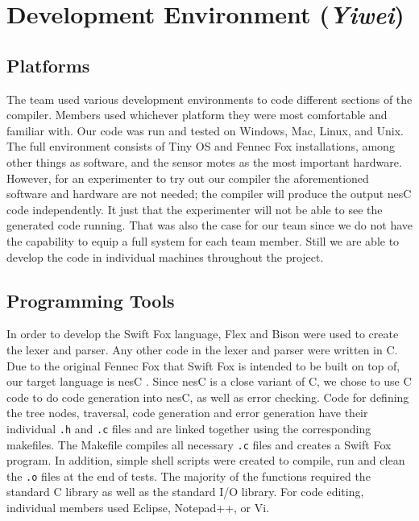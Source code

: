 \section{Development Environment (\textit{Yiwei})}

\subsection{Platforms}

The team used various development environments to code different sections
of the compiler. Members used whichever platform they were most comfortable
and familiar with. Our code was run and tested on Windows, Mac, Linux, and
Unix. The full environment consists of Tiny OS \cite{dunkels:2004a} and
Fennec Fox installations, among other things as software, and the sensor
motes as the most important hardware. However, for an experimenter to try
out our compiler the aforementioned software and hardware are not needed;
the compiler will produce the output nesC code independently. It just that
the experimenter will not be able to see the generated code running. That
was also the case for our team since we do not have the capability to
equip a full system for each team member. Still we are able to develop the code in individual machines throughout the project.

\subsection{Programming Tools}

In order to develop the Swift Fox language, Flex and Bison were used to
create the lexer and parser. Any other code in the lexer and parser were
written in C. Due to the original Fennec Fox that Swift Fox is intended to 
be built on top of, our target language is nesC \cite{gay:2003}. Since nesC
is a close variant of C, we chose to use C code to do code generation into 
nesC, as well as error checking. Code for defining the tree nodes,
traversal, code generation and error generation have their individual
\texttt{.h} and \texttt{.c} files and are linked together using the
corresponding makefiles. The Makefile compiles all necessary \texttt{.c}
files and creates a Swift Fox program. In addition, simple shell scripts
were created to compile, run and clean the \texttt{.o} files at the end of 
tests. The majority of the functions required the standard C library
as well as the standard I/O library. For code editing, individual members
used Eclipse, Notepad++, or Vi.

